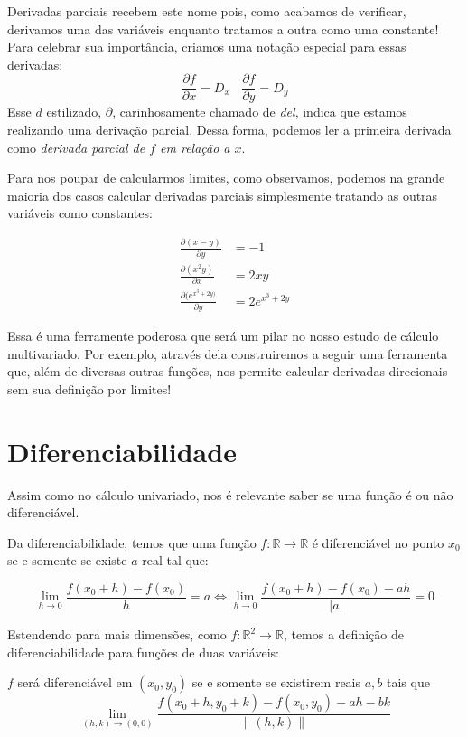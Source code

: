 \documentclass[
  portuguese,
  letterpaper,
  DIV=11,
  numbers=noendperiod]{scrreport}
\begin{document}
Derivadas parciais recebem este nome pois, como acabamos de verificar,
derivamos uma das variáveis enquanto tratamos a outra como uma
constante! Para celebrar sua importância, criamos uma notação especial
para essas derivadas: \[
\frac{\partial f}{\partial x} = D_x ~~~~ \frac{\partial f}{\partial y} = D_y
\] Esse \(d\) estilizado, \(\partial\), carinhosamente chamado de
\emph{del}, indica que estamos realizando uma derivação parcial. Dessa
forma, podemos ler a primeira derivada como \emph{derivada parcial de
\(f\) em relação a \(x\)}.

Para nos poupar de calcularmos limites, como observamos, podemos na
grande maioria dos casos calcular derivadas parciais simplesmente
tratando as outras variáveis como constantes:

\[
\begin{aligned}
\frac{\partial (x - y)}{\partial y} &= -1 \\
\frac{\partial (x^2y)}{\partial x } &= 2xy \\
\frac{\partial (e^{x^3+2y)}}{\partial y} &= 2 e^{x^3 + 2y} 
\end{aligned}
\]

Essa é uma ferramente poderosa que será um pilar no nosso estudo de
cálculo multivariado. Por exemplo, através dela construiremos a seguir
uma ferramenta que, além de diversas outras funções, nos permite
calcular derivadas direcionais sem sua definição por limites!

\section{Diferenciabilidade}\label{diferenciabilidade}

Assim como no cálculo univariado, nos é relevante saber se uma função é
ou não diferenciável.

Da diferenciabilidade, temos que uma função
\(f: \mathbb{R} \rightarrow \mathbb{R}\) é diferenciável no ponto
\(x_0\) se e somente se existe \(a\) real tal que:

\[
\lim_{h\rightarrow 0 } \frac{f(x_0+h)-f(x_0)}{h} = a \Leftrightarrow 
\lim_{h\rightarrow 0 } \frac{f(x_0+h) - f(x_0) - ah}{\lvert a \rvert} = 0
\]

Estendendo para mais dimensões, como
\(f: \mathbb{R}^2 \rightarrow \mathbb{R}\), temos a definição de
diferenciabilidade para funções de duas variáveis:

\(f\) será diferenciável em \((x_0,y_0)\) se e somente se existirem
reais \(a, b\) tais que \[
\lim_{(h,k) \rightarrow (0,0)} \frac{f(x_0+h, y_0+k) - f(x_0,y_0) -ah -bk}{\lVert (h,k) \rVert}
\]
\end{document}
